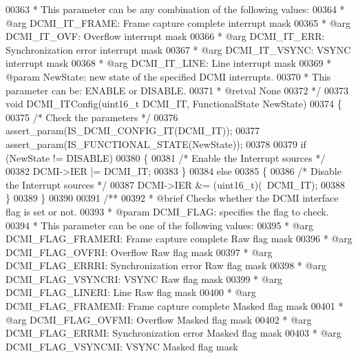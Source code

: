 \begin{DoxyCode}
00363 \textcolor{comment}{  *          This parameter can be any combination of the following values:}
00364 \textcolor{comment}{  *            @arg DCMI\_IT\_FRAME: Frame capture complete interrupt mask}
00365 \textcolor{comment}{  *            @arg DCMI\_IT\_OVF: Overflow interrupt mask}
00366 \textcolor{comment}{  *            @arg DCMI\_IT\_ERR: Synchronization error interrupt mask}
00367 \textcolor{comment}{  *            @arg DCMI\_IT\_VSYNC: VSYNC interrupt mask}
00368 \textcolor{comment}{  *            @arg DCMI\_IT\_LINE: Line interrupt mask}
00369 \textcolor{comment}{  * @param  NewState: new state of the specified DCMI interrupts.}
00370 \textcolor{comment}{  *          This parameter can be: ENABLE or DISABLE.}
00371 \textcolor{comment}{  * @retval None}
00372 \textcolor{comment}{  */}
00373 \textcolor{keywordtype}{void} DCMI_ITConfig(uint16\_t DCMI\_IT, FunctionalState NewState)
00374 \{
00375   \textcolor{comment}{/* Check the parameters */}
00376   assert_param(IS\_DCMI\_CONFIG\_IT(DCMI\_IT));
00377   assert_param(IS\_FUNCTIONAL\_STATE(NewState));
00378 
00379   \textcolor{keywordflow}{if} (NewState != DISABLE)
00380   \{
00381     \textcolor{comment}{/* Enable the Interrupt sources */}
00382     DCMI->IER |= DCMI\_IT;
00383   \}
00384   \textcolor{keywordflow}{else}
00385   \{
00386     \textcolor{comment}{/* Disable the Interrupt sources */}
00387     DCMI->IER &= (uint16\_t)(~DCMI\_IT);
00388   \}
00389 \}
00390 
00391 \textcolor{comment}{/**}
00392 \textcolor{comment}{  * @brief  Checks whether the  DCMI interface flag is set or not.}
00393 \textcolor{comment}{  * @param  DCMI\_FLAG: specifies the flag to check.}
00394 \textcolor{comment}{  *          This parameter can be one of the following values:}
00395 \textcolor{comment}{  *            @arg DCMI\_FLAG\_FRAMERI: Frame capture complete Raw flag mask}
00396 \textcolor{comment}{  *            @arg DCMI\_FLAG\_OVFRI: Overflow Raw flag mask}
00397 \textcolor{comment}{  *            @arg DCMI\_FLAG\_ERRRI: Synchronization error Raw flag mask}
00398 \textcolor{comment}{  *            @arg DCMI\_FLAG\_VSYNCRI: VSYNC Raw flag mask}
00399 \textcolor{comment}{  *            @arg DCMI\_FLAG\_LINERI: Line Raw flag mask}
00400 \textcolor{comment}{  *            @arg DCMI\_FLAG\_FRAMEMI: Frame capture complete Masked flag mask}
00401 \textcolor{comment}{  *            @arg DCMI\_FLAG\_OVFMI: Overflow Masked flag mask}
00402 \textcolor{comment}{  *            @arg DCMI\_FLAG\_ERRMI: Synchronization error Masked flag mask}
00403 \textcolor{comment}{  *            @arg DCMI\_FLAG\_VSYNCMI: VSYNC Masked flag mask}

\end{DoxyCode}
